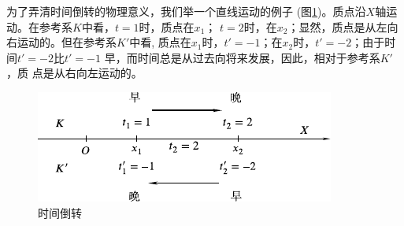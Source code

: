 \documentclass[../outline-of-mechanics.tex]{subfiles}
\begin{document}
为了弄清时间倒转的物理意义，我们举一个直线运动的例子
(图\ref{fig:02.05})。质点沿$X$轴运动。在参考系$K$中看，$t=1$时，质点在$x_1$；
$t=2$时，在$x_2$；显然，质点是从左向右运动的。但在参考系$K'$中看,
质点在$x_1$时，$t'=-1$；在$x_2$时，$t'=-2$；由于时间$t'=-2$比$t'=-1$
早，而时间总是从过去向将来发展，因此，相对于参考系$K'$，质
点是从右向左运动的。
\begin{figure}[h]
  \centering
  \includegraphics{figure/fig02.05}
  \caption{时间倒转}
  \label{fig:02.05}
\end{figure}
\end{document}

